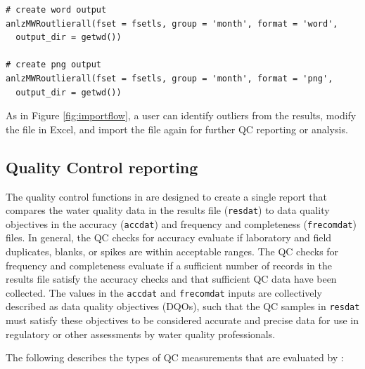 \begin{verbatim}
# create word output
anlzMWRoutlierall(fset = fsetls, group = 'month', format = 'word', 
  output_dir = getwd())

# create png output
anlzMWRoutlierall(fset = fsetls, group = 'month', format = 'png', 
  output_dir = getwd())
\end{verbatim}

As in Figure \ref{fig:importflow}, a user can identify outliers from the results, modify the file in Excel, and import the file again for further QC reporting or analysis.

\hypertarget{quality-control-reporting}{%
\subsection{Quality Control reporting}\label{quality-control-reporting}}

The quality control functions in  are designed to create a single report that compares the water quality data in the results file (\texttt{resdat}) to data quality objectives in the accuracy (\texttt{accdat}) and frequency and completeness (\texttt{frecomdat}) files. In general, the QC checks for accuracy evaluate if laboratory and field duplicates, blanks, or spikes are within acceptable ranges. The QC checks for frequency and completeness evaluate if a sufficient number of records in the results file satisfy the accuracy checks and that sufficient QC data have been collected. The values in the \texttt{accdat} and \texttt{frecomdat} inputs are collectively described as data quality objectives (DQOs), such that the QC samples in \texttt{resdat} must satisfy these objectives to be considered accurate and precise data for use in regulatory or other assessments by water quality professionals.

The following describes the types of QC measurements that are evaluated by :

